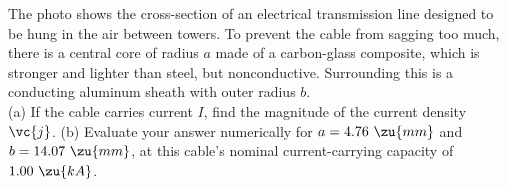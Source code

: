 The photo shows the cross-section of an electrical transmission line designed to be hung
in the air between towers. To prevent the cable from sagging too much, there is a central
core of radius $a$ made of a carbon-glass composite, which is stronger and lighter than steel, but
nonconductive. Surrounding this is a conducting aluminum sheath with outer radius $b$.\\
(a) If the cable carries current $I$, find the magnitude of the current density $\vc{j}$.\answercheck\hwendpart
(b) Evaluate your answer numerically for $a=4.76\ \zu{mm}$ and $b=14.07\ \zu{mm}$, at this cable's
nominal current-carrying capacity of $1.00\ \zu{kA}$.\answercheck\hwendpart

